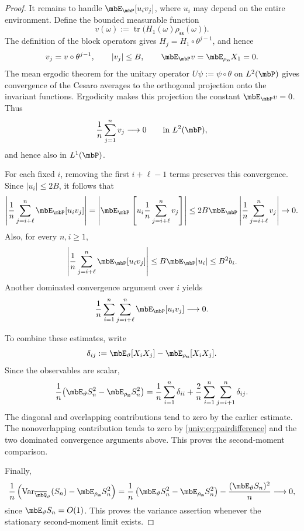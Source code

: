 \documentclass[a4paper]{article}
\numberwithin{equation}{section}   %
\theoremstyle{plain}   %
\theoremstyle{plain}   %
\theoremstyle{examplestyle}
\DeclareMathOperator{\pr}{\mbP}           %
\newcommand{\s}{\rho_{\mathsf{ss}}}     %
\DeclareMathOperator{\str}{tr} %
\begin{document}
\begin{proof}
    It remains to handle $\mbE_{\pr}[u_i v_j]$, where $u_i$ may depend on the entire environment.
    Define the bounded measurable function
    \[
        v(\omega)
        :=
        \str\bigl(H_1(\omega)\s(\omega)\bigr).
    \]
    The definition of the block operators gives $H_j=H_1\circ\theta^{j-1}$, and hence
    \[
        v_j=v\circ\theta^{j-1},
        \qquad
        |v_j|\le B,
        \qquad
        \mbE_{\pr}v=\mbE_{\s}X_1=0.
    \]
    The mean ergodic theorem for the unitary operator $U\psi:=\psi\circ\theta$ on $L^2(\pr)$ gives convergence of the Cesaro averages to the orthogonal projection onto the invariant functions.
    Ergodicity makes this projection the constant $\mbE_{\pr}v=0$. 
    Thus
    \[
        \frac1n\sum_{j=1}^n v_j
        \longrightarrow0
        \qquad\text{in }L^2(\pr),
    \]
    and hence also in $L^1(\pr)$.

    For each fixed $i$, removing the first $i+\ell-1$ terms preserves this convergence.
    Since $|u_i|\le2B$, it follows that
    \[
            \left|
                \frac1n
                \sum_{j=i+\ell}^n
                    \mbE_{\pr}[u_i v_j]
            \right|
            =
            \left|
                \mbE_{\pr}\left[
                    u_i\frac1n\sum_{j=i+\ell}^n v_j
                \right]
            \right|
            \le
            2B\mbE_{\pr}
                \left|
                    \frac1n\sum_{j=i+\ell}^n v_j
                \right|
            \to0.
    \]
    Also, for every $n,i\ge1$,
    \[
        \left|
            \frac1n
            \sum_{j=i+\ell}^n\mbE_{\pr}[u_i v_j]
        \right|
        \le
        B\mbE_{\pr}|u_i|
        \le B^2b_i.
    \]
    Another dominated convergence argument over $i$ yields
    \[
        \frac1n
        \sum_{i=1}^n\sum_{j=i+\ell}^n
            \mbE_{\pr}[u_i v_j]
        \longrightarrow0.
    \]

    To combine these estimates, write
    \[
        \delta_{ij}
        :=
        \mbE_\vartheta[X_iX_j]
        -
        \mbE_{\s}[X_iX_j].
    \]
    Since the observables are scalar,
    \[
        \frac1n
        \bigl(
            \mbE_\vartheta S_n^2-\mbE_{\s}S_n^2
        \bigr)
        =
        \frac1n\sum_{i=1}^n\delta_{ii}
        +
        \frac2n\sum_{i=1}^n\sum_{j=i+1}^n\delta_{ij}.
    \]
    The diagonal and overlapping contributions tend to zero by the earlier estimate. 
    The nonoverlapping contribution tends to zero by \eqref{univ:eq:pairdifference} and the two dominated convergence arguments above.
    This proves the second-moment comparison.
    
    Finally,
    \[
            \frac1n
            \left(
                \operatorname{Var}_{\overline\mbQ_\vartheta}(S_n)
                -
                \mbE_{\s}S_n^2
            \right)
            =
            \frac1n
            \left(
                \mbE_\vartheta S_n^2-\mbE_{\s}S_n^2
            \right)
            -
            \frac{(\mbE_\vartheta S_n)^2}{n}
            \longrightarrow0,
    \]
    since $\mbE_\vartheta S_n=O(1)$.
    This proves the variance assertion whenever the stationary second-moment limit exists.
\end{proof}
\end{document}
